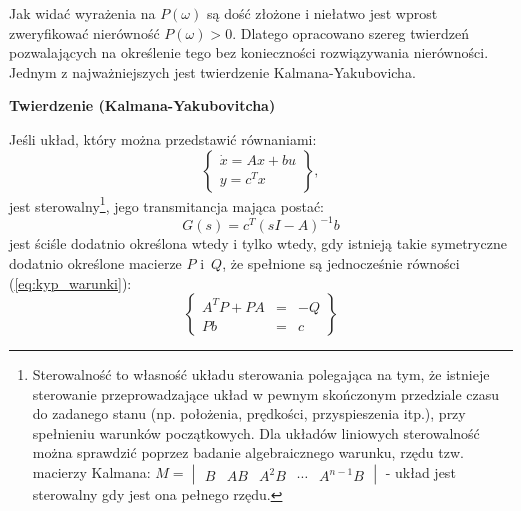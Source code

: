 \documentclass{article}
\begin{document}
        Jak widać wyrażenia na $P(\omega)$ są dość złożone i niełatwo jest wprost zweryfikować nierówność $P(\omega) > 0$.
        Dlatego opracowano szereg twierdzeń pozwalających na określenie tego bez konieczności rozwiązywania nierówności.
        Jednym z najważniejszych jest twierdzenie Kalmana-Yakubovicha.

        
        \textbf{Twierdzenie (Kalmana-Yakubovitcha)}

        Jeśli układ, który można przedstawić równaniami:%
        $$
            \left\{
            \begin{array}{l}
                \dot{x} = Ax + bu\\
                y = c^{T}x
            \end{array}
            \right\},
        $$
        jest sterowalny\footnote{Sterowalność to własność układu sterowania polegająca na tym, że istnieje sterowanie przeprowadzające układ w pewnym skończonym przedziale czasu do zadanego stanu (np. położenia, prędkości, przyspieszenia itp.), przy spełnieniu warunków początkowych. Dla układów liniowych sterowalność można sprawdzić poprzez badanie algebraicznego warunku, rzędu tzw. macierzy Kalmana: $M = \begin{vmatrix}B & AB & A^{2}B & \cdots & A^{n-1}B\end{vmatrix}$ - układ jest sterowalny gdy jest ona pełnego rzędu.}, jego transmitancja mająca postać:
        $$
            G(s) = c^{T}(sI-A)^{-1}b
        $$
        jest ściśle dodatnio określona wtedy i tylko wtedy, gdy istnieją takie symetryczne dodatnio określone macierze $P$ i~$Q$, że spełnione są jednocześnie równości (\ref{eq:kyp_warunki}):
        \begin{equation}
            \label{eq:kyp_warunki}
            \left\{
            \begin{array}{rcl}
                A^{T}P + PA & = & -Q\\
                Pb & = &  c
            \end{array}
            \right\}
        \end{equation}
\end{document}
